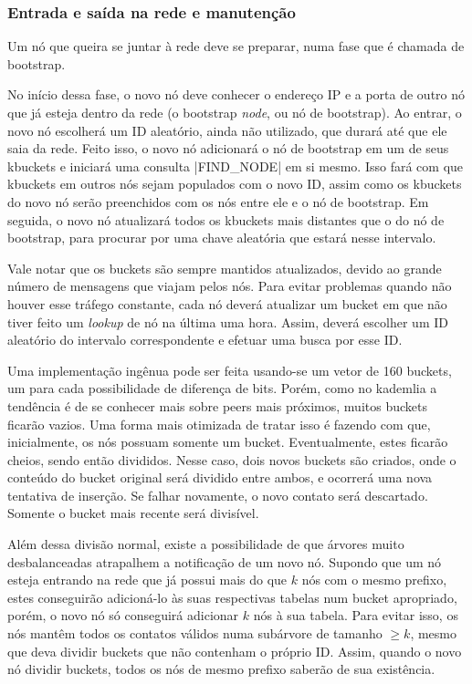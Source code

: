 
\subsubsection*{Entrada e saída na rede e manutenção}

Um nó que queira se juntar à rede deve se preparar, numa fase que é chamada de
\gls{bootstrap}.

No início dessa fase, o novo nó deve conhecer o endereço IP e a porta de outro nó que já
esteja dentro da rede (o \gls*{bootstrap} \emph{node}, ou nó de \gls*{bootstrap}). Ao
entrar, o novo nó escolherá um ID aleatório, ainda não utilizado, que durará até que ele
saia da rede. Feito isso, o novo nó adicionará o nó de \gls*{bootstrap} em um de seus
\glspl*{kbucket} e iniciará uma consulta \bverb|FIND_NODE| em si mesmo. Isso fará com
que \glspl*{kbucket} em outros nós sejam populados com o novo ID, assim como os
\glspl*{kbucket} do novo nó serão preenchidos com os nós entre ele e o nó de
\gls*{bootstrap}. Em seguida, o novo nó atualizará todos os \glspl*{kbucket} mais
distantes que o do nó de \gls*{bootstrap}, para procurar por uma chave aleatória que
estará nesse intervalo.

Vale notar que os \glspl*{bucket} são sempre mantidos atualizados, devido ao grande
número de mensagens que viajam pelos nós. Para evitar problemas quando não houver esse
tráfego constante, cada nó deverá atualizar um \gls*{bucket} em que não tiver feito um
\emph{lookup} de nó na última uma hora. Assim, deverá escolher um ID aleatório do
intervalo correspondente e efetuar uma busca por esse ID.

Uma implementação ingênua pode ser feita usando-se um vetor de 160 \glspl*{bucket}, um
para cada possibilidade de diferença de bits. Porém, como no \gls*{kademlia} a tendência
é de se conhecer mais sobre \glspl*{peer} mais próximos, muitos \glspl*{bucket} ficarão
vazios. Uma forma mais otimizada de tratar isso é fazendo com que, inicialmente, os nós
possuam somente um \gls*{bucket}. Eventualmente, estes ficarão cheios, sendo então
divididos. Nesse caso, dois novos \glspl*{bucket} são criados, onde o conteúdo do
\gls*{bucket} original será dividido entre ambos, e ocorrerá uma nova tentativa de
inserção. Se falhar novamente, o novo contato será descartado. Somente o \gls*{bucket}
mais recente será divisível.

\newpage

Além dessa divisão normal, existe a possibilidade de que árvores muito desbalanceadas
atrapalhem a notificação de um novo nó. Supondo que um nó esteja entrando na rede que
já possui mais do que $k$ nós com o mesmo prefixo, estes conseguirão adicioná-lo às
suas respectivas tabelas num \gls*{bucket} apropriado, porém, o novo nó só conseguirá
adicionar $k$ nós à sua tabela. Para evitar isso, os nós mantêm todos os contatos
válidos numa subárvore de tamanho $\geq k$, mesmo que deva dividir \glspl*{bucket} que
não contenham o próprio ID. Assim, quando o novo nó dividir \glspl*{bucket}, todos os
nós de mesmo prefixo saberão de sua existência.


